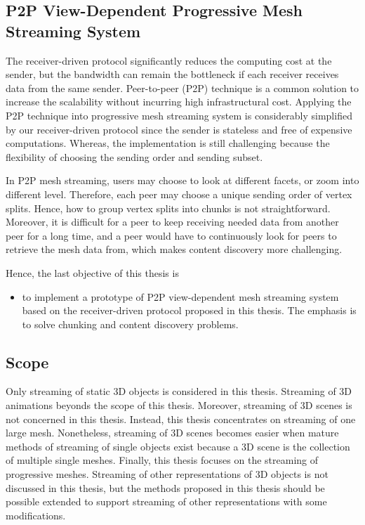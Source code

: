 \documentclass[11pt, a4paper]{report}
\begin{document}
    \subsection{P2P View-Dependent Progressive Mesh Streaming System}
    The receiver-driven protocol significantly reduces the computing cost at the sender,
    but the bandwidth can remain the bottleneck if each receiver receives data
    from the same sender. Peer-to-peer (P2P) technique is a common solution to increase
    the scalability without incurring high infrastructural cost. 
    Applying the P2P technique into progressive mesh streaming system
    is considerably simplified by our receiver-driven protocol since 
    the sender is stateless and free of expensive computations.
    Whereas, the implementation is still challenging because the flexibility
    of choosing the sending order and sending subset.
    
    In P2P mesh streaming, users 
    may choose to look at different facets, or zoom into different level.
    Therefore, each peer may choose a unique sending order of
    vertex splits. Hence, how to group vertex splits into chunks is not
    straightforward. Moreover, it is difficult for a peer to keep receiving
    needed data from another peer for a long time, and  
    a peer would have to continuously look for peers to retrieve the mesh data from, 
    which makes content discovery more challenging.

    Hence, the last objective of this thesis is 
    \begin{itemize}
        \item
            to implement a prototype of P2P view-dependent mesh streaming system
            based on the receiver-driven protocol proposed in this thesis.
            The emphasis is to solve chunking and content discovery problems. 
    \end{itemize}
    
    \subsection{Scope}
    Only streaming of static 3D objects is considered in this thesis. 
    Streaming of 3D animations beyonds the scope of this thesis. 
    Moreover, streaming of 3D scenes is not concerned in this thesis.
    Instead, this thesis concentrates on streaming of one large mesh.
    Nonetheless, streaming of 3D scenes becomes easier when mature methods
    of streaming of single objects exist because a 3D scene is the collection
    of multiple single meshes.
    Finally, this thesis focuses on the streaming of progressive meshes. 
    Streaming of other representations of 3D objects is not discussed in this thesis,
    but the methods proposed in this thesis should be possible
    extended to support streaming of other representations with some modifications.
    
\end{document}
